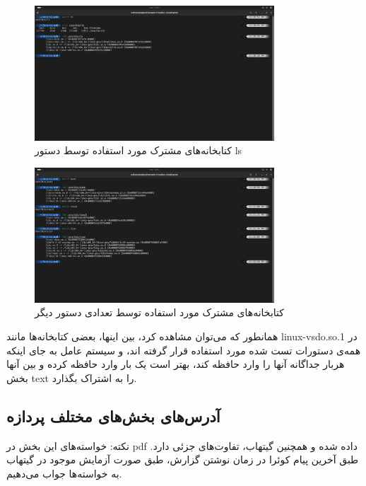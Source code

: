 \documentclass[12pt]{article}
\begin{document}
        \begin{figure}[H]
		\centering
		\includegraphics[width=0.8\textwidth]{report6-resources/9.png}
		\caption{کتابخانه‌های مشترک مورد استفاده توسط دستور \textenglish{ls}}
            \label{im9}
	\end{figure}

        \begin{figure}[H]
		\centering
		\includegraphics[width=0.8\textwidth]{report6-resources/10.png}
		\caption{کتابخانه‌های مشترک مورد استفاده توسط تعدادی دستور دیگر}
            \label{im10}
	\end{figure}

        همانطور که می‌توان مشاهده کرد، بین اینها، بعضی کتابخانه‌ها مانند
        \textenglish{linux-vsdo.so.1}
        در همه‌ی دستورات تست شده مورد استفاده قرار گرفته اند، و سیستم عامل به جای اینکه هربار جداگانه آنها را وارد حافظه کند، بهتر است یک بار وارد حافظه کرده و بین آنها بخش
        \textenglish{text}
        را به اشتراک بگذارد.

        \subsection{آدرس‌های بخش‌های مختلف پردازه}

        

        نکته: خواسته‌های این بخش در 
        \textenglish{pdf}
        داده شده و همچنین گیتهاب، تفاوت‌های جزئی دارد. طبق آخرین پیام کوئرا در زمان نوشتن گزارش، طبق صورت آزمایش موجود در گیتهاب به خواسته‌ها جواب می‌دهیم.
\end{document}
